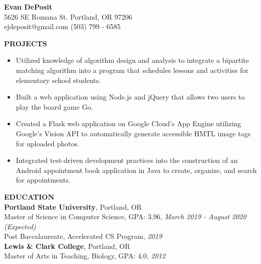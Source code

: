\documentclass[a4paper,11pt]{article}
\begin{document}
\thispagestyle{empty}
\begin{center}
\noindent \Large{\textbf{Evan DePosit}}\\
\large{5626 SE Romana St. Portland, OR 97206}\\
\large{ejdeposit@gmail.com } (503) 799 - 6585
\end{center}
\bigskip

\noindent
\makebox[0pt][l]{\rule[-.2\baselineskip]{\linewidth}{.3mm}}%
\large{\textbf{PROJECTS}}
%
\begin{itemize}[leftmargin=*, itemsep=0pt, topsep=5pt]
	\item Utilized knowledge of algorithm design and analysis to integrate a bipartite matching algorithm into a program that schedules lessons and activities for elementary school students.
	\item Built a web application using Node.js and jQuery that allows two users to play the board game Go.
	\item Created a Flask web application on Google Cloud’s App Engine utilizing Google’s Vision API to automatically generate accessible HMTL image tags for uploaded photos.
	\item Integrated test-driven development practices into the construction of an Android appointment book application in Java to create, organize, and search for appointments.
\end{itemize}
\bigbreak \noindent
%
\makebox[0pt][l]{\rule[-.2\baselineskip]{\linewidth}{.3mm}}%
\large{\textbf{EDUCATION}} \smallskip \\
%
\textbf{Portland State University}, Portland, OR\\
Master of Science in Computer Science, GPA: 3.96, \textit{March 2019 - August 2020 (Expected)}\\
Post Baccalaureate, Accelerated CS Program, \textit{2019} \medskip \\
%
\textbf{Lewis \& Clark College}, Portland, OR\\
Master of Arts in Teaching, Biology, GPA: 4.0, \textit{2012} \medskip \\
\end{document}

